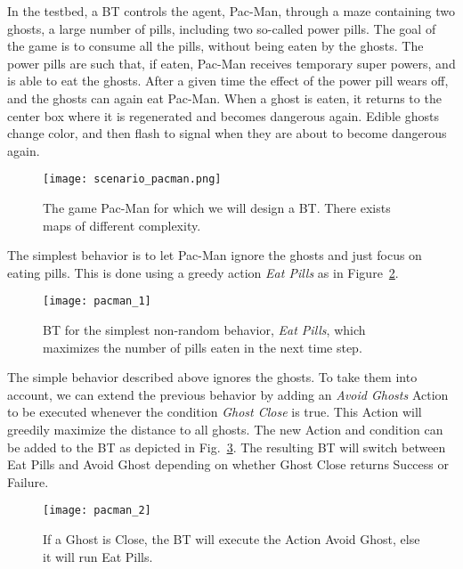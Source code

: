 In the testbed, a BT controls the agent, Pac-Man, through a maze containing two ghosts, a large number of  pills, including two so-called power pills. 
The goal of the game is to consume all the pills, without being eaten by the ghosts. The power pills are such that, if eaten, Pac-Man receives temporary super powers, and is able to eat the ghosts. After a given time the effect of the power pill wears off, and the ghosts can again eat Pac-Man.
 When a ghost is eaten, it returns to the center box where it is regenerated and becomes dangerous again. Edible ghosts change color, and then flash to signal when they are about to become dangerous again.
\begin{figure}[h]
\centering
\texttt{[image: scenario\_pacman.png]}
\caption{The game Pac-Man for which we will design a BT. There exists maps of different complexity.}
\label{bts.fig.ScenarioPacMan}
\end{figure}

The simplest behavior is to let Pac-Man ignore the ghosts and just focus on eating pills.
This is done using a greedy action
 \emph{Eat Pills} as in Figure~\ref{bts.fig.greedy}.

\begin{figure}[h]
\centering
\texttt{[image: pacman\_1]}
\caption{BT for the simplest non-random behavior, \emph{Eat Pills}, which maximizes the number of pills eaten in the next time step.}
\label{bts.fig.greedy}
\end{figure}

The simple behavior described above ignores the ghosts. 
To take them into account,  we can extend the previous behavior by adding an \emph{Avoid Ghosts} Action to be executed whenever the condition \emph{Ghost Close} is true. This Action will 
greedily maximize the distance to all ghosts.
The new Action and condition can be added to the BT as depicted in 
 Fig.~\ref{bts.fig.avoid}.
The resulting BT will switch between Eat Pills and Avoid Ghost depending on whether Ghost Close returns Success or Failure.

\begin{figure}[h]
\centering
\texttt{[image: pacman\_2]}
\caption{If a Ghost is Close, the BT will execute the Action Avoid Ghost, else it will run Eat Pills.}
\label{bts.fig.avoid}
\end{figure}

